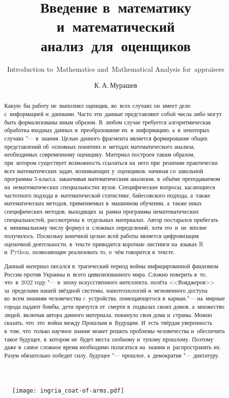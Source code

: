 \documentclass[]{scrartcl}
\title{Введение в~математику и~математический анализ~для~оценщиков}
\subtitle{\foreignlanguage{English}{Introduction to~Mathematics and~Mathematical Analysis for~appraisers}}
\author{К.\,А.\,Мурашев}
\begin{document}
\maketitle

\begin{figure}[ht]
	\centering
	\texttt{[image: ingria\_coat-of-arms.pdf]}
\end{figure}

\begin{abstract}
	Какую~бы работу не~выполнял оценщик, во~всех случаях он~имеет дело с~информацией и~данными. Часто эти~данные представляют собой числа либо могут быть формализованы иным образом. В~любом случае требуется алгоритмическая обработка входных данных и~преобразование их~в~информацию, а~в~некоторых случаях "--- в~знания. Целью данного фрагмента является формирование общих представлений об~основных понятиях и~методах математического анализа, необходимых современному оценщику. Материал построен таким образом, при~котором существует возможность ссылаться на~него при~решении практически всех математических задач, возникающих у~оценщиков, начиная со~школьной программы 5-класса, заканчивая математическим анализом, в~объёме преподаваемом на~нематематических специальностях вузов. Специфические вопросы, касающиеся частотного подхода в~математической статистике, байесовского подхода, а~также математических методов, применяемых в~машинном обучении, а~также иных специфических методов, выходящих за~рамки программы нематематических специальностей, рассмотрены в~отдельных материалах.  Автор постарался прибегать к~минимальному числу формул и~сложных определений, хотя это~и~не~вполне получилось. Поскольку конечной целью всей работы является цифровизация оценочной деятельности, в~тексте приводятся короткие листинги на~языках R и~Python, позволяющие реализовать то, о~чём говорится в~тексте.
	
	Данный материал писался в~трагический период войны инфицированной фашизмом России против Украины и~всего цивилизованного мира. Сложно поверить в~то, что~в~2022 году "--- в~эпоху искусственного интеллекта, полёта <<Вояджеров>> за~пределами нашей звёздной системы, нанотехнологий и~мгновенного доступа ко~всем знаниям человечества c~устройства, помещающегося в~карман,"--- на~мирные города падают бомбы, дети прячутся от~смерти в~подвалах своих домов, а~множество людей, включая автора данного материала, покинуло свои дома и~страны.  Можно сказать, что~это~война между Прошлым и~Будущим. И~есть твёрдая уверенность в~том, что~только научное знание может решить проблемы человечества и~обеспечить такое будущее, в~котором не~будет места злобному и~тупому прошлому. Поэтому даже в~самое сложное время необходимо полагаться на~знания и~распространять их. Разум обязательно победит силу, будущее "--- прошлое, а~демократия "--- диктатуру. 
	

\end{abstract}
\end{document}
